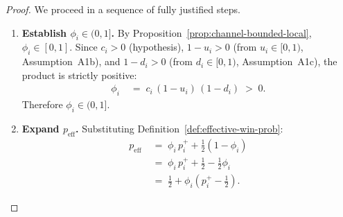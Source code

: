 \documentclass[12pt,openany]{book}
\numberwithin{equation}{chapter}
\theoremstyle{plain}
\theoremstyle{definition}
\theoremstyle{remark}
\numberwithin{equation}{chapter}
\theoremstyle{plain}
\begin{document}
\begin{proof}
We proceed in a sequence of fully justified steps.

\begin{enumerate}
  \item[\textup{(1)}] \textbf{Establish $\phi_i \in (0,1]$.}
        By Proposition~\ref{prop:channel-bounded-local},
        $\phi_i \in [0,1]$.  Since $c_i > 0$ (hypothesis),
        $1 - u_i > 0$ (from $u_i \in [0,1)$, Assumption~A1b),
        and $1 - d_i > 0$ (from $d_i \in [0,1)$,
        Assumption~A1c), the product is strictly positive:
        \begin{align}
          \phi_i
          &\;=\; c_i\,(1-u_i)\,(1-d_i)
          \;>\; 0.
          \label{eq:phi-strict-pos}
        \end{align}
        Therefore $\phi_i \in (0,1]$.

  \item[\textup{(2)}] \textbf{Expand $p_{\mathrm{eff}}$.}
        Substituting Definition~\ref{def:effective-win-prob}:
        \begin{align}
          p_{\mathrm{eff}}
          &\;=\; \phi_i\,p_i^+
                 + \tfrac{1}{2}(1 - \phi_i)
          \nonumber\\
          &\;=\; \phi_i\,p_i^+
                 + \tfrac{1}{2}
                 - \tfrac{1}{2}\phi_i
          \nonumber\\
          &\;=\; \tfrac{1}{2}
                 + \phi_i\!\left(p_i^+ - \tfrac{1}{2}\right).
          \label{eq:peff-expanded}
        \end{align}


\end{enumerate}
\end{proof}
\end{document}
